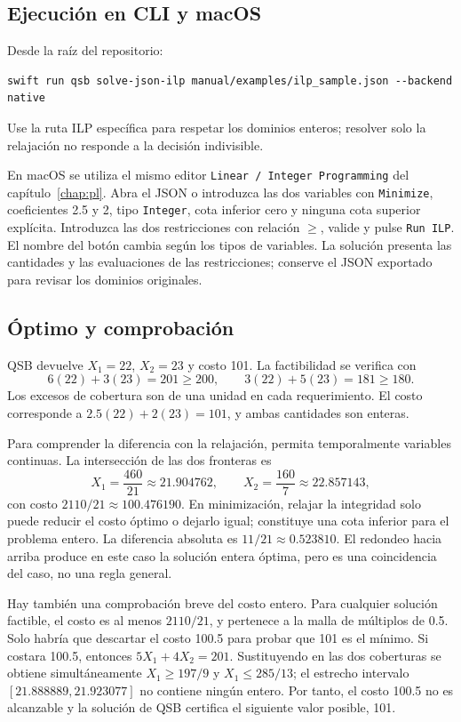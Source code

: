 \subsection{Ejecución en CLI y macOS}
Desde la raíz del repositorio:
\begin{lstlisting}
swift run qsb solve-json-ilp manual/examples/ilp_sample.json --backend native
\end{lstlisting}
Use la ruta ILP específica para respetar los dominios enteros; resolver solo
la relajación no responde a la decisión indivisible.

En macOS se utiliza el mismo editor \texttt{Linear / Integer Programming}
del capítulo~\ref{chap:pl}. Abra el JSON o introduzca las dos variables con
\texttt{Minimize}, coeficientes 2.5 y 2, tipo \texttt{Integer}, cota inferior
cero y ninguna cota superior explícita. Introduzca las dos restricciones con
relación \(\geq\), valide y pulse \texttt{Run ILP}. El nombre del botón cambia
según los tipos de variables. La solución presenta las cantidades y las
evaluaciones de las restricciones; conserve el JSON exportado para revisar
los dominios originales.

\subsection{Óptimo y comprobación}
QSB devuelve \(X_1=22\), \(X_2=23\) y costo 101. La factibilidad se verifica
con
\[
 6(22)+3(23)=201\geq200,\qquad3(22)+5(23)=181\geq180.
\]
Los excesos de cobertura son de una unidad en cada requerimiento. El costo
corresponde a \(2.5(22)+2(23)=101\), y ambas cantidades son enteras.

Para comprender la diferencia con la relajación, permita temporalmente
variables continuas. La intersección de las dos fronteras es
\[
 X_1=\frac{460}{21}\approx21.904762,\qquad
 X_2=\frac{160}{7}\approx22.857143,
\]
con costo \(2110/21\approx100.476190\). En minimización, relajar la integridad
solo puede reducir el costo óptimo o dejarlo igual; constituye una cota inferior
para el problema entero. La diferencia absoluta es \(11/21\approx0.523810\).
El redondeo hacia arriba produce en este caso la solución entera óptima, pero
es una coincidencia del caso, no una regla general.

Hay también una comprobación breve del costo entero. Para cualquier solución
factible, el costo es al menos \(2110/21\), y pertenece a la malla de múltiplos
de 0.5. Solo habría que descartar el costo 100.5 para probar que 101 es el
mínimo. Si costara 100.5, entonces \(5X_1+4X_2=201\). Sustituyendo en las
dos coberturas se obtiene simultáneamente
\(X_1\geq197/9\) y \(X_1\leq285/13\); el estrecho intervalo
\([21.888889,21.923077]\) no contiene ningún entero. Por tanto, el costo
100.5 no es alcanzable y la solución de QSB certifica el siguiente valor
posible, 101.


